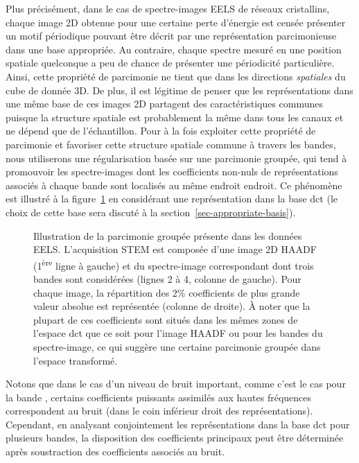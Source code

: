Plus précisément, dans le cas de spectre-images EELS de réseaux cristallins, chaque image 2D obtenue pour une certaine perte d'énergie est censée présenter un motif périodique pouvant être décrit par une représentation parcimonieuse dans une base appropriée. Au contraire, chaque spectre mesuré en une position spatiale quelconque a peu de chance de présenter une périodicité particulière. Ainsi, cette propriété de parcimonie ne tient que dans les directions \emph{spatiales} du cube de donnée 3D.
%
De plus, il est légitime de penser que les représentations dans une même base de ces images 2D partagent des caractéristiques communes puisque la structure spatiale est probablement la même dans tous les canaux et ne dépend que de l'échantillon. Pour à la fois exploiter cette propriété de parcimonie et favoriser cette structure spatiale commune à travers les bandes, nous utiliserons une régularisation basée sur une parcimonie groupée, qui tend à promouvoir les spectre-images dont les coefficients non-nuls de représentations
associés à chaque bande sont localisés au même endroit endroit.
%
Ce phénomène est illustré à la figure~\ref{fig-joint-sparsity} en considérant une représentation dans la base \gls{dct} (le choix de cette base sera discuté à la section~\ref{sec-appropriate-basis}).
\begin{figure}[t]
    \centering
    
    \caption{\protect\label{fig-joint-sparsity}
        Illustration de la parcimonie groupée présente dans les données EELS. L'acquisition STEM est composée d'une image 2D HAADF  (1\textsuperscript{ère} ligne à gauche) et du spectre-image correspondant dont trois bandes sont considérées (lignes 2 à 4, colonne de gauche). Pour chaque image, la répartition des 2\% coefficients de plus grande valeur absolue est représentée (colonne de droite). 
        \`A noter que la plupart de ces coefficients sont situés dans les mêmes zones de l'espace \gls{dct} que ce soit pour l'image HAADF ou pour les bandes du spectre-image, ce qui suggère une certaine parcimonie groupée dans l'espace transformé.}
\end{figure}
Notons que dans le cas d'un niveau de bruit important, comme c'est le cas pour la bande \num{} , certains coefficients puissants assimilés aux hautes fréquences correspondent au bruit (dans le coin inférieur droit des représentations). Cependant, en analysant conjointement les représentations dans la base \gls{dct} pour plusieurs bandes, la disposition des coefficients principaux peut être déterminée après soustraction des coefficients associés au bruit.


